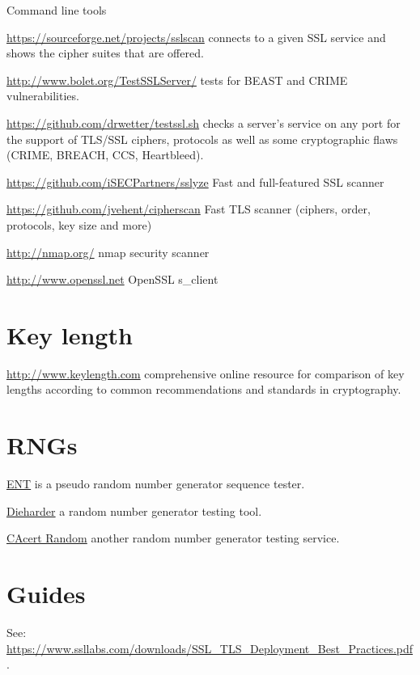 Command line tools
\begin{itemize*}
  \item \url{https://sourceforge.net/projects/sslscan} connects to a given SSL service and shows the cipher suites that are offered.
  \item \url{http://www.bolet.org/TestSSLServer/} tests for BEAST and CRIME vulnerabilities.
  \item \url{https://github.com/drwetter/testssl.sh} checks a server's service on any port for the support of TLS/SSL ciphers, protocols as well as some cryptographic flaws (CRIME, BREACH, CCS, Heartbleed).
  \item \url{https://github.com/iSECPartners/sslyze} Fast and full-featured SSL scanner
  \item \url{https://github.com/jvehent/cipherscan} Fast TLS scanner (ciphers, order, protocols, key size and more)
  \item \url{http://nmap.org/} nmap security scanner
  \item \url{http://www.openssl.net} OpenSSL s\_client
\end{itemize*}


\section{Key length}
\begin{itemize*}
  \item \url{http://www.keylength.com} comprehensive online resource for comparison of key lengths according to common recommendations and standards in cryptography.
\end{itemize*}


\section{RNGs}

\begin{itemize*}
  \item \href{http://www.fourmilab.ch/random/}{ENT} is a pseudo random number generator sequence tester.
  \item \href{http://www.phy.duke.edu/~rgb/General/dieharder.php}{Dieharder} a random number generator testing tool.
  \item \href{http://www.cacert.at/random/}{CAcert Random} another random number generator testing service.
\end{itemize*}

\section{Guides}
\begin{itemize*}
  \item See: \url{https://www.ssllabs.com/downloads/SSL_TLS_Deployment_Best_Practices.pdf}.
\end{itemize*}
